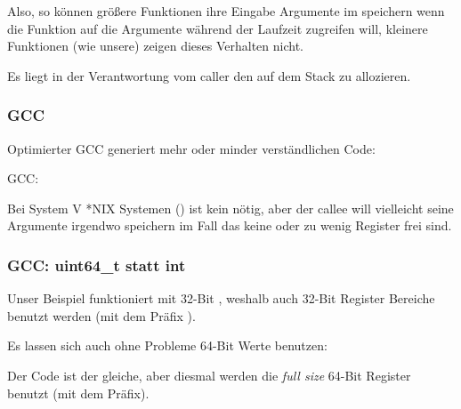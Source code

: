 Also, so können größere Funktionen ihre Eingabe Argumente im  speichern wenn die Funktion
auf die Argumente während der Laufzeit zugreifen will, kleinere Funktionen (wie unsere) zeigen dieses Verhalten 
nicht. 

Es liegt in der Verantwortung vom \gls{caller} den  auf dem Stack zu allozieren.

\subsubsection{GCC}

Optimierter GCC generiert mehr oder minder verständlichen Code:



\NonOptimizing GCC:




Bei System V *NIX Systemen (\SysVABI) ist kein  nötig, aber der \gls{callee} will vielleicht
seine Argumente irgendwo speichern im Fall das keine oder zu wenig Register frei sind.

\subsubsection{GCC: uint64\_t statt int}

Unser Beispiel funktioniert mit 32-Bit \Tint, weshalb auch 32-Bit Register Bereiche benutzt werden (mit dem Präfix ).

Es lassen sich auch ohne Probleme 64-Bit Werte benutzen:





Der Code ist der gleiche, aber diesmal werden die \emph{full size} 64-Bit Register benutzt (mit dem  Präfix).

